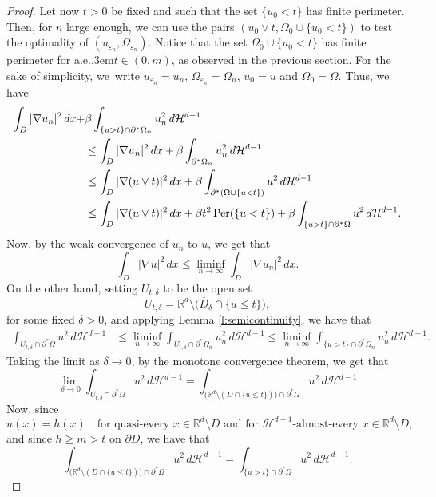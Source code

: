 \documentclass[JEP,XML,SOM,Unicode]{cedram}
\renewcommand{\ae}{a.e.\kern.3em}
\newcommand{\Per}{\mathrm{Per}}
\theoremstyle{plain}
\theoremstyle{definition}
\let\eps\varepsilon
\def\R{\mathbb{R}}
\def\HH{\mathcal{H}}
\begin{document}
\begin{proof}
Let now $t>0$ be fixed and such that the set $\{u_0<t\}$ has finite perimeter. Then, for $n$ large enough, we can use the pairs
$(u_0\vee t, \Omega_0\cup\{u_0< t\})$ to test the optimality of $(u_{\eps_n},\Omega_{\eps_n})$.
Notice that the set $\Omega_0\cup\{u_0< t\}$ has finite perimeter for \ae $t\in (0,m)$, as observed in the previous section.
For the sake of simplicity, we~write $u_{\eps_n}=u_n$, $\Omega_{\eps_n}=\Omega_n$, $u_0=u$ and $\Omega_0=\Omega$. Thus, we have
\begin{align}
\int_{D}|\nabla u_{n}|^2\,dx+&\beta\int_{\{u> t\}\cap \partial^\ast\Omega_{n}}u_{n}^2\,d\HH^{d-1}\notag\\
&\le \int_{D}|\nabla u_{n}|^2\,dx+\beta\int_{\partial^\ast\Omega_{n}}u_{n}^2\,d\HH^{d-1}\notag\\
&\le \int_{D}|\nabla (u\vee t)|^2\,dx+\beta\int_{\partial^\ast(\Omega\cup\{u<t\})}u^2\,d\HH^{d-1}\label{e:att}\\
&\le \int_{D}|\nabla (u\vee t)|^2\,dx+\beta t^2\, \Per(\{u<t\})+\beta\int_{\{u> t\}\cap \partial^\ast\Omega}u^2\,d\HH^{d-1}.\notag
\end{align}
Now, by the weak convergence of $u_n$ to $u$, we get that
\[\int_{D}|\nabla u|^2\,dx\le \liminf_{n\to\infty}\int_{D}|\nabla u_{n}|^2\,dx.\]
On the other hand, setting $U_{t,\delta}$ to be the open set
\[U_{t,\delta}=\R^d\setminus \big(\overline D_\delta\cap\{u\le t\}\big),\]
for some fixed $\delta>0$, and applying Lemma \ref{l:semicontinuity}, we have that
\begin{align*}
\int_{U_{t,\delta}\cap \partial^\ast\Omega}u^2\,d\HH^{d-1}&\le \liminf_{n\to\infty}\int_{U_{t,\delta}\cap \partial^\ast\Omega_{n}}u_{n}^2\,d\HH^{d-1}\le \liminf_{n\to\infty}\int_{\{u>t\}\cap \partial^\ast\Omega_{n}}u_{n}^2\,d\HH^{d-1}.
\end{align*}
Taking the limit as $\delta\to0$, by the monotone convergence theorem, we get that
\[\lim_{\delta\to0}\int_{U_{t,\delta}\cap \partial^\ast\Omega}u^2\,d\HH^{d-1}=\int_{\big(\R^d\setminus (D\cap\{u\le t\})\big)\cap \partial^\ast\Omega}u^2\,d\HH^{d-1}\]
Now, since
\[u(x)=h(x)\quad\text{for quasi-every } x\in \R^d\setminus D\text{ and for } \HH^{d-1}\text{-almost-every } x\in \R^d\setminus D,\]
and since $h\ge m>t$ on $\partial D$, we have that
\begin{equation}%
\int_{\big(\R^d\setminus (D\cap\{u\le t\})\big)\cap \partial^\ast\Omega}u^2\,d\HH^{d-1}=\int_{\{u>t\}\cap \partial^\ast\Omega}u^2\,d\HH^{d-1}.
\end{equation}

\end{proof}
\end{document}

